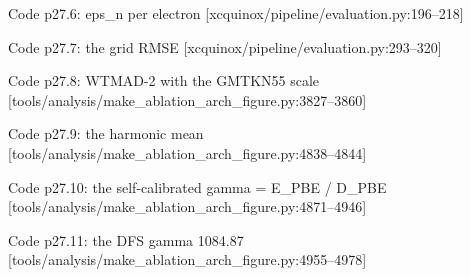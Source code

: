 \begin{frame}[allowframebreaks]{Code p27.6: eps\_n per electron [xcquinox/pipeline/evaluation.py:196--218]}
\label{code:p27_6_eps_n_per_electron}
\end{frame}
\begin{frame}[allowframebreaks]{Code p27.7: the grid RMSE [xcquinox/pipeline/evaluation.py:293--320]}
\label{code:p27_7_the_grid_rmse}
\end{frame}
\begin{frame}[allowframebreaks]{Code p27.8: WTMAD-2 with the GMTKN55 scale [tools/analysis/make\_ablation\_arch\_figure.py:3827--3860]}
\label{code:p27_8_wtmad_2_with_the_gmtkn55_scale}
\end{frame}
\begin{frame}[allowframebreaks]{Code p27.9: the harmonic mean [tools/analysis/make\_ablation\_arch\_figure.py:4838--4844]}
\label{code:p27_9_the_harmonic_mean}
\end{frame}
\begin{frame}[allowframebreaks]{Code p27.10: the self-calibrated gamma = E\_PBE / D\_PBE [tools/analysis/make\_ablation\_arch\_figure.py:4871--4946]}
\label{code:p27_10_the_self_calibrated_gamma_e_pbe_d_pbe}
\end{frame}
\begin{frame}[allowframebreaks]{Code p27.11: the DFS gamma 1084.87 [tools/analysis/make\_ablation\_arch\_figure.py:4955--4978]}
\label{code:p27_11_the_dfs_gamma_1084_87}
\end{frame}
